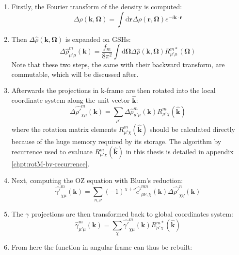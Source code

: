 \begin{enumerate}
\item Firstly, the Fourier transform of the density is computed:
\begin{equation}
\Delta\hat{\rho}(\mathbf{k},\mathbf{\Omega})=\int\mathrm{d}\mathbf{r}\Delta\rho(\mathbf{r},\mathbf{\Omega})e^{-i\mathbf{k}\cdot\mathbf{r}}\label{eq:fft3d-fwd}
\end{equation}
\item Then $\Delta\hat{\rho}(\mathbf{k},\mathbf{\Omega})$ is expanded on
\acs{GSH}s:
\begin{equation}
\Delta\hat{\rho}_{\mu'\mu}^{m}(\mathbf{k})=\frac{f_{m}}{8\pi^{2}}\int\mathrm{d}\mathbf{\Omega}\Delta\hat{\rho}(\mathbf{k},\mathbf{\Omega})R_{\mu'\mu}^{m*}(\mathbf{\Omega})\label{eq:fgsht-fwd}
\end{equation}
Note that these two steps, the same with their backward transform,
are commutable, which will be discussed after.
\item Afterwards the projections in k-frame are then rotated into the local
coordinate system along the unit vector $\mathbf{\hat{k}}$:
\begin{equation}
\Delta\hat{\rho'}_{\chi\mu}^{m}(\mathbf{k})=\sum_{\mu'}\Delta\hat{\rho}_{\mu'\mu}^{m}(\mathbf{k})R_{\mu'\chi}^{m}(\mathbf{\hat{k}})\label{eq:2.2.rho-rot-rho}
\end{equation}
where the rotation matrix elements $R_{\mu'\chi}^{m}(\mathbf{\hat{k}})$
should be calculated directly because of the huge memory required
by its storage. The algorithm by recurrence used to evaluate $R_{\mu'\chi}^{m}(\mathbf{\hat{k}})$
in this thesis is detailed in appendix \ref{chpt:rotM-by-recurrence}.
\item Next, computing the OZ equation with Blum's reduction:
\begin{equation}
\hat{\gamma'}_{\chi\mu}^{m}(\mathbf{k})=\sum_{n,\nu}(-1)^{\chi+\nu}\hat{c'}_{\mu\nu,\chi}^{mn}(\mathbf{k})\Delta\hat{\rho'}_{\chi\underline{\nu}}^{n}(\mathbf{k})\label{eq:OZ-2}
\end{equation}
\item The $\gamma$ projections are then transformed back to global coordinates
system:
\begin{equation}
\hat{\gamma}_{\mu'\mu}^{m}(\mathbf{k})=\sum_{\chi}\hat{\gamma'}_{\chi\mu}^{m}(\mathbf{k})R_{\mu'\chi}^{m*}(\mathbf{\hat{k}})
\end{equation}
\item From here the function in angular frame can thus be rebuilt:
\begin{equation}

\end{equation}
\end{enumerate}
